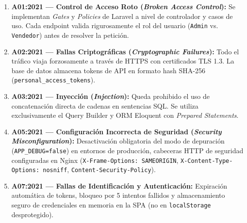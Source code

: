 \begin{enumerate}[leftmargin=*]
    \item \textbf{A01:2021 --- Control de Acceso Roto (\textit{Broken Access Control}):} Se implementan \textit{Gates} y \textit{Policies} de Laravel a nivel de controlador y casos de uso. Cada endpoint valida rigurosamente el rol del usuario (\texttt{Admin} vs. \texttt{Vendedor}) antes de resolver la petición.
    \item \textbf{A02:2021 --- Fallas Criptográficas (\textit{Cryptographic Failures}):} Todo el tráfico viaja forzosamente a través de HTTPS con certificados TLS 1.3. La base de datos almacena tokens de API en formato hash SHA-256 (\texttt{personal\_access\_tokens}).
    \item \textbf{A03:2021 --- Inyección (\textit{Injection}):} Queda prohibido el uso de concatenación directa de cadenas en sentencias SQL. Se utiliza exclusivamente el Query Builder y ORM Eloquent con \textit{Prepared Statements}.
    \item \textbf{A05:2021 --- Configuración Incorrecta de Seguridad (\textit{Security Misconfiguration}):} Desactivación obligatoria del modo de depuración (\texttt{APP\_DEBUG=false}) en entornos de producción, cabeceras HTTP de seguridad configuradas en Nginx (\texttt{X-Frame-Options: SAMEORIGIN}, \texttt{X-Content-Type-Options: nosniff}, \texttt{Content-Security-Policy}).
    \item \textbf{A07:2021 --- Fallas de Identificación y Autenticación:} Expiración automática de tokens, bloqueo por 5 intentos fallidos y almacenamiento seguro de credenciales en memoria en la SPA (no en \texttt{localStorage} desprotegido).
\end{enumerate}
